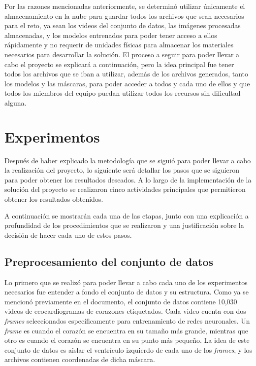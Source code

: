 \documentclass[runningheads]{llncs}
\begin{document}
Por las razones mencionadas anteriormente, se determinó utilizar únicamente el almacenamiento en la nube para guardar todos los archivos que sean necesarios para el reto, ya sean los videos del conjunto de datos, las imágenes procesadas almacenadas, y los modelos entrenados para poder tener acceso a ellos rápidamente y no requerir de unidades físicas para almacenar los materiales necesarios para desarrollar la solución. El proceso a seguir para poder llevar a cabo el proyecto se explicará a continuación, pero la idea principal fue tener todos los archivos que se iban a utilizar, además de los archivos generados, tanto los modelos y las máscaras, para poder acceder a todos y cada uno de ellos y que todos los miembros del equipo puedan utilizar todos los recursos sin dificultad alguna.

\section{Experimentos}
Después de haber explicado la metodología que se siguió para poder llevar a cabo la realización del proyecto, lo siguiente será detallar los pasos que se siguieron para poder obtener los resultados deseados. A lo largo de la implementación de la solución del proyecto se realizaron cinco actividades principales que permitieron obtener los resultados obtenidos.

A continuación se mostrarán cada una de las etapas, junto con una explicación a profundidad de los procedimientos que se realizaron y una justificación sobre la decisión de hacer cada uno de estos pasos.

\subsection{Preprocesamiento del conjunto de datos}
Lo primero que se realizó para poder llevar a cabo cada uno de los experimentos necesarios fue entender a fondo el conjunto de datos y su estructura.
Como ya se mencionó previamente en el documento, el conjunto de datos contiene 10,030 videos de ecocardiogramas de corazones etiquetados. Cada video cuenta con dos \textit{frames} seleccionados específicamente para entrenamiento de redes neuronales. Un \textit{frame} es cuando el corazón se encuentra en su tamaño más grande, mientras que otro es cuando el corazón se encuentra en su punto más pequeño. La idea de este conjunto de datos es aislar el ventrículo izquierdo de cada uno de los \textit{frames}, y los archivos contienen coordenadas de dicha máscara.
\end{document}
